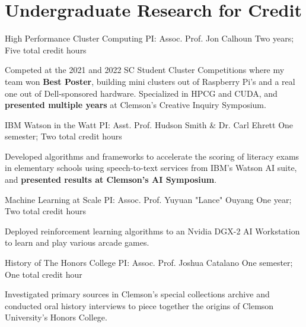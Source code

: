 \section{\textbf{Undergraduate Research for Credit}}
\vspace{-0.4mm}
\resumeSubHeadingListStart

\resumeProject
{High Performance Cluster Computing}
{PI: Assoc. Prof. Jon Calhoun}
{Two years; Five total credit hours}
{}
\resumeItemListStart
\item[] Competed at the 2021 and 2022 SC Student Cluster Competitions where my team won \textbf{Best Poster}, building mini clusters out of Raspberry Pi's and a real one out of Dell-sponsored hardware. Specialized in HPCG and CUDA, and \textbf{presented multiple years} at Clemson's Creative Inquiry Symposium.
\resumeItemListEnd

\resumeProject
{IBM Watson in the Watt}
{PI: Asst. Prof. Hudson Smith \& Dr. Carl Ehrett}
{One semester; Two total credit hours}
{}
\resumeItemListStart
\item[] Developed algorithms and frameworks to accelerate the scoring of literacy exams in elementary schools using speech-to-text services from IBM's Watson AI suite, and \textbf{presented results at Clemson's AI Symposium}.
\resumeItemListEnd

\resumeProject
{Machine Learning at Scale}
{PI: Assoc. Prof. Yuyuan "Lance" Ouyang}
{One year; Two total credit hours}
{}
\resumeItemListStart
\item[] Deployed reinforcement learning algorithms to an Nvidia DGX-2 AI Workstation to learn and play various arcade games.
\resumeItemListEnd

\resumeProject
{History of The Honors College}
{PI: Assoc. Prof. Joshua Catalano}
{One semester; One total credit hour}
{}
\resumeItemListStart
\item[] Investigated primary sources in Clemson's special collections archive and conducted oral history interviews to piece together the origins of Clemson University's Honors College.
\resumeItemListEnd

\resumeSubHeadingListEnd
\vspace{-6mm}
